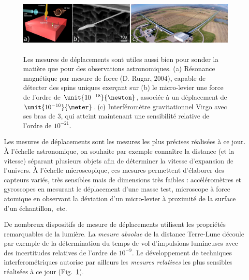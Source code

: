 \documentclass[12pt,a4paper]{article}
\begin{document}
\begin{figure}[b]
\center
\includegraphics[height=90pt]{figures/displacement.png}
\caption{Les mesures de déplacements sont utiles aussi bien pour sonder la matière que pour des observations astronomiques.
(a) Résonance magnétique par mesure de force (D. Rugar, 2004), capable de détecter des spins uniques exerçant sur (b) le micro-levier une force de l'ordre de $\unit{10^{-18}}{\newton}$, associée à un déplacement de $\unit{10^{-10}}{\meter}$.
(c) Interféromètre gravitationnel Virgo avec ses bras de \unit{3}{\kilo\meter}, qui atteint maintenant une sensibilité relative de l'ordre de $10^{-21}$.}
\label{fig:displacement_measurement}
\end{figure}

Les mesures de déplacements sont les mesures les plus précises réalisées à ce jour.
À l'échelle astronomique, on souhaite par exemple connaître la distance (et la vitesse) séparant plusieurs objets afin de déterminer la vitesse d'expansion de l'univers.
À l'échelle microscopique, ces mesures permettent d'élaborer des capteurs variés, très sensibles mais de dimensions très faibles : accéléromètres et gyroscopes en mesurant le déplacement d'une masse test, microscope à force atomique en observant la déviation d'un micro-levier à proximité de la surface d'un échantillon,~etc.
 
De nombreux dispositifs de mesure de déplacements utilisent les propriétés remarquables de la lumière.
La \textit{mesure absolue} de la distance Terre-Lune découle par exemple de la détermination du temps de vol d'impulsions lumineuses avec des incertitudes relatives de l'ordre de $10^{-9}$.
Le développement de techniques interferométriques autorise par ailleurs les \textit{mesures relatives} les plus sensibles réalisées à ce jour (Fig.~\ref{fig:displacement_measurement}).
\end{document}
